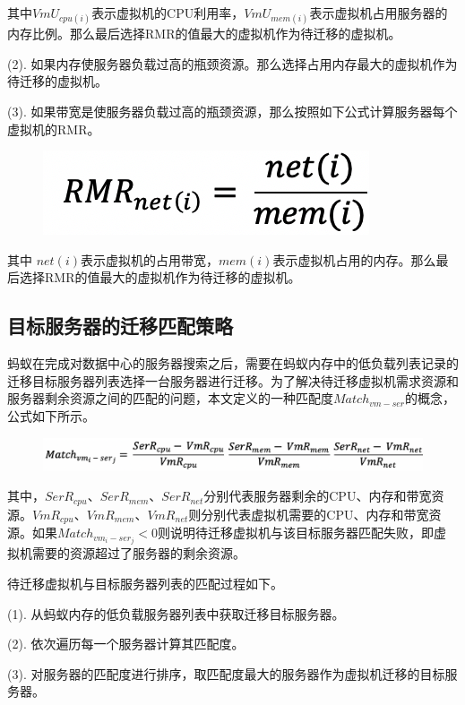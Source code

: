       其中$ VmU_{cpu(i)} $表示虚拟机的CPU利用率，$VmU_{mem(i)} $表示虚拟机占用服务器的内存比例。那么最后选择RMR的值最大的虚拟机作为待迁移的虚拟机。
    
    (2). 如果内存使服务器负载过高的瓶颈资源。那么选择占用内存最大的虚拟机作为待迁移的虚拟机。
    
    (3). 如果带宽是使服务器负载过高的瓶颈资源，那么按照如下公式计算服务器每个虚拟机的RMR。

    \begin{figure}[htb]
      \centering
      \includegraphics[width=0.3\linewidth]{./Figure/IMG_Chap3_13.png}
    \end{figure}

    其中 $ net(i) $表示虚拟机的占用带宽，$ mem(i) $表示虚拟机占用的内存。那么最后选择RMR的值最大的虚拟机作为待迁移的虚拟机。

\subsection{目标服务器的迁移匹配策略}
蚂蚁在完成对数据中心的服务器搜索之后，需要在蚂蚁内存中的低负载列表记录的迁移目标服务器列表选择一台服务器进行迁移。为了解决待迁移虚拟机需求资源和服务器剩余资源之间的匹配的问题，本文定义的一种匹配度$ Match_{vm-ser} $的概念，公式如下所示。

\begin{figure}[htb]
  \centering
  \includegraphics[width=0.8\linewidth]{./Figure/IMG_Chap3_14.png}
\end{figure}

其中，$ SerR_{cpu} $、$ SerR_{mem} $、$ SerR_{net} $分别代表服务器剩余的CPU、内存和带宽资源。$ VmR_{cpu} $、$ VmR_{mem} $、$ VmR_{net} $则分别代表虚拟机需要的CPU、内存和带宽资源。如果$ Match_{vm_i-ser_j} < 0 $则说明待迁移虚拟机与该目标服务器匹配失败，即虚拟机需要的资源超过了服务器的剩余资源。

待迁移虚拟机与目标服务器列表的匹配过程如下。

    (1). 从蚂蚁内存的低负载服务器列表中获取迁移目标服务器。

    (2). 依次遍历每一个服务器计算其匹配度。

    (3). 对服务器的匹配度进行排序，取匹配度最大的服务器作为虚拟机迁移的目标服务器。

